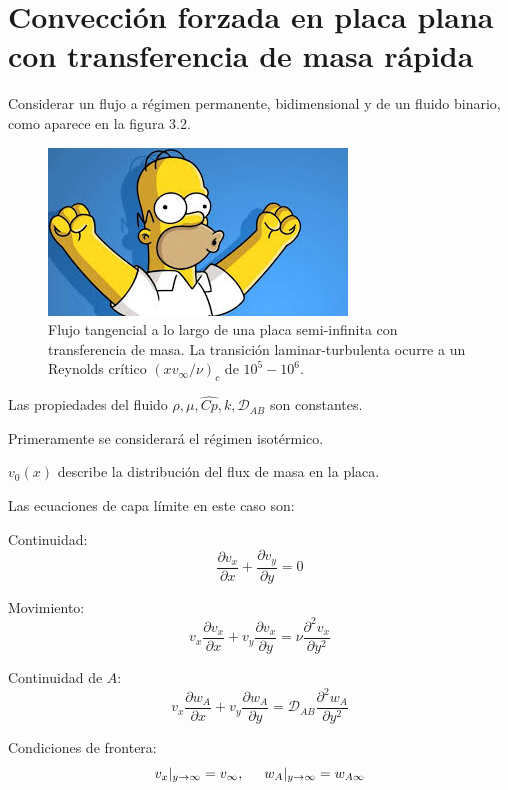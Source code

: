 \section{Convección forzada en placa plana con transferencia de masa rápida}
Considerar un flujo a régimen permanente, bidimensional y de un fluido binario, como aparece en la figura 3.2.

\begin{figure}[H]
	\center
	\includegraphics[scale=0.5]{./Capitulo3/Imagenes/Fig_3.2.JPG}
	\caption{Flujo tangencial a lo largo de una placa semi-infinita con transferencia de masa. La transición laminar-turbulenta ocurre a un Reynolds crítico $(xv_\infty / \nu)_c$ de $10^5 - 10^6$. } 
	 \label{fig:Fig_3.2}
\end{figure}

Las propiedades del fluido $\rho, \mu, \hat{Cp}, k, \mathscr{D}_{AB}$ son constantes. 

Primeramente se considerará el régimen isotérmico. 

$v_0(x)$ describe la distribución del flux de masa en la placa.

Las ecuaciones de capa límite en este caso son:

Continuidad:
\begin{equation}
	\frac{\partial v_x}{\partial x} + 		\frac{\partial v_y}{\partial y} = 0
	\label{eq_3.22}
\end{equation}

Movimiento: 
\begin{equation}
	v_x \frac{\partial v_x}{\partial x} + v_y \frac{\partial v_x}{\partial y} = \nu \frac{\partial^2 v_x}{\partial y^2}
	\label{eq_3.23}
\end{equation}

Continuidad de $A$:
\begin{equation}
	v_x \frac{\partial w_A}{\partial x} + v_y \frac{\partial w_A}{\partial y} = \mathscr{D}_{AB} \frac{\partial^2 w_A}{\partial y^2}
	\label{eq_3.24}
\end{equation}

Condiciones de frontera:
\begin{equation}
	v_x |_{y \to \infty} = v_\infty, \hspace{0.5cm} w_A | _{y \to \infty} = w_{A\infty}
	\label{eq_3.25}
\end{equation}

